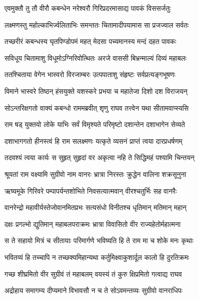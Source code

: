 
\twolineshloka
{एवमुक्तौ तु तौ वीरौ कबन्धेन नरेश्वरौ}
{गिरिप्रदरमासाद्य पावकं विससर्जतुः} %

\twolineshloka
{लक्ष्मणस्तु महोल्काभिर्ज्वलिताभिः समन्ततः}
{चितामादीपयामास सा प्रजज्वाल सर्वतः} %

\twolineshloka
{तच्छरीरं कबन्धस्य घृतपिण्डोपमं महत्}
{मेदसा पच्यमानस्य मन्दं दहत पावकः} %

\twolineshloka
{सविधूय चितामाशु विधूमोऽग्निरिवोत्थितः}
{अरजे वाससी बिभ्रन्माल्यं दिव्यं महाबलः} %

\twolineshloka
{ततश्चिताया वेगेन भास्वरो विरजाम्बरः}
{उत्पपाताशु संहृष्टः सर्वप्रत्यङ्गभूषणः} %

\twolineshloka
{विमाने भास्वरे तिष्ठन् हंसयुक्ते यशस्करे}
{प्रभया च महातेजा दिशो दश विराजयन्} %

\twolineshloka
{सोऽन्तरिक्षगतो वाक्यं कबन्धो राममब्रवीत्}
{शृणु राघव तत्त्वेन यथा सीतामवाप्स्यसि} %

\twolineshloka
{राम षड् युक्तयो लोके याभिः सर्वं विमृश्यते}
{परिमृष्टो दशान्तेन दशाभागेन सेव्यते} %

\twolineshloka
{दशाभागगतो हीनस्त्वं हि राम सलक्ष्मणः}
{यत्कृते व्यसनं प्राप्तं त्वया दारप्रधर्षणम्} %

\twolineshloka
{तदवश्यं त्वया कार्यः स सुहृत् सुहृदां वर}
{अकृत्वा नहि ते सिद्धिमहं पश्यामि चिन्तयन्} %

\twolineshloka
{श्रूयतां राम वक्ष्यामि सुग्रीवो नाम वानरः}
{भ्रात्रा निरस्तः क्रुद्धेन वालिना शक्रसूनुना} %

\twolineshloka
{ऋष्यमूके गिरिवरे पम्पापर्यन्तशोभिते}
{निवसत्यात्मवान् वीरश्चतुर्भिः सह वानरैः} %

\twolineshloka
{वानरेन्द्रो महावीर्यस्तेजोवानमितप्रभः}
{सत्यसंधो विनीतश्च धृतिमान् मतिमान् महान्} %

\twolineshloka
{दक्षः प्रगल्भो द्युतिमान् महाबलपराक्रमः}
{भ्रात्रा विवासितो वीर राज्यहेतोर्महात्मना} %

\twolineshloka
{स ते सहायो मित्रं च सीतायाः परिमार्गणे}
{भविष्यति हि ते राम मा च शोके मनः कृथाः} %

\twolineshloka
{भवितव्यं हि तच्चापि न तच्छक्यमिहान्यथा}
{कर्तुमिक्ष्वाकुशार्दूल कालो हि दुरतिक्रमः} %

\twolineshloka
{गच्छ शीघ्रमितो वीर सुग्रीवं तं महाबलम्}
{वयस्यं तं कुरु क्षिप्रमितो गत्वाद्य राघव} %

\twolineshloka
{अद्रोहाय समागम्य दीप्यमाने विभावसौ}
{न च ते सोऽवमन्तव्यः सुग्रीवो वानराधिपः} %

